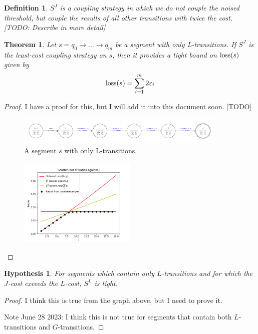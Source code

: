 \documentclass{article}
\newtheorem{theorem}{Theorem}
\newtheorem{hypothesis}{Hypothesis}[section]
\newtheorem{definition}{Definition}[section]
\renewcommand{\epsilon}{\varepsilon}
\newcommand{\loss}{\textup{loss}}
\begin{document}
\begin{definition}
    $S^J$ is a coupling strategy in which we do not couple the noised threshold, but couple the results of all other transitions with twice the cost. [TODO: Describe in more detail]
\end{definition}

\begin{theorem}
    Let $s = q_0 \to \dots \to q_m$ be a segment with only L-transitions. If $S^J$ is the least-cost coupling strategy on $s$, then it provides a tight bound on $\loss(s)$ given by \[\loss(s) = \sum_{i = 1}^{m} 2\epsilon_i\]
\end{theorem}

\begin{proof}
    I have a proof for this, but I will add it into this document soon. [TODO]

    \begin{figure}[H]
        \centering
        \includegraphics[width=0.9\textwidth]{figures/only_l_transitions.png}
        \caption{A segment $s$ with only L-transitions.}
        \label{fig:segment_j}
    \end{figure}

    \begin{figure}[H]
        \centering
        \includegraphics[width=0.5\textwidth]{figures/only_l_transitions_plot.png}
        \caption{}
        \label{fig:segment_j_coupling}
    \end{figure}
\end{proof}

\begin{hypothesis}
    For segments which contain only $L$-transitions and for which the $J$-cost exceeds the $L$-cost, $S^L$ is tight.
\end{hypothesis}

\begin{proof}
    I think this is true from the graph above, but I need to prove it.

    Note June 28 2023: I think this is not true for segments that contain both $L$-transitions and $G$-transitions.
\end{proof}
\end{document}
